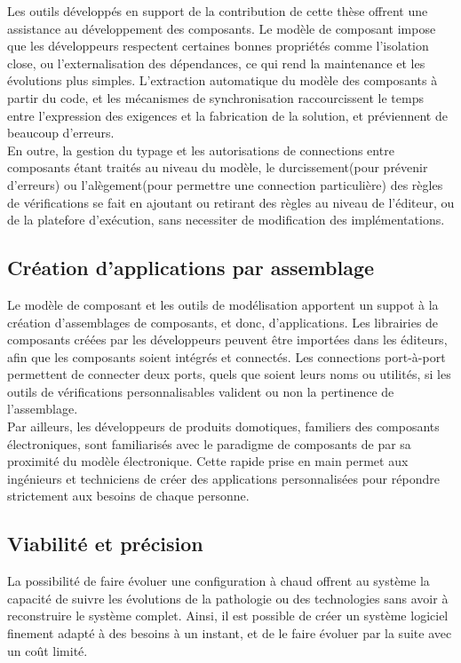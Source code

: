 Les outils développés en support de la contribution de cette thèse offrent une assistance au développement des composants. Le modèle de composant impose que les développeurs respectent certaines bonnes propriétés comme l'isolation close, ou l'externalisation des dépendances, ce qui rend la maintenance et les évolutions plus simples. L'extraction automatique du modèle des composants à partir du code, et les mécanismes de synchronisation raccourcissent le temps entre l'expression des exigences et la fabrication de la solution, et préviennent de beaucoup d'erreurs.\\
En outre, la gestion du typage et les autorisations de connections entre composants étant traités au niveau du modèle, le durcissement(pour prévenir d'erreurs) ou l'alègement(pour permettre une connection particulière) des règles de vérifications se fait en ajoutant ou retirant des règles au niveau de l'éditeur, ou de la platefore d'exécution, sans necessiter de modification des implémentations.	

\subsection{Création d'applications par assemblage}
Le modèle de composant et les outils de modélisation apportent un suppot à la création d'assemblages de composants, et donc, d'applications. Les librairies de composants créées par les développeurs peuvent être importées dans les éditeurs, afin que les composants soient intégrés et connectés. Les connections port-à-port permettent de connecter deux ports, quels que soient leurs noms ou utilités, si les outils de vérifications personnalisables valident ou non la pertinence de l'assemblage.\\
Par ailleurs, les développeurs de produits domotiques, familiers des composants électroniques, sont familiarisés avec le paradigme de composants de par sa proximité du modèle électronique. Cette rapide prise en main permet aux ingénieurs et techniciens de créer des applications personnalisées pour répondre strictement aux besoins de chaque personne.

\subsection{Viabilité et précision}
La possibilité de faire évoluer une configuration à chaud offrent au système la capacité de suivre les évolutions de la pathologie ou des technologies sans avoir à reconstruire le système complet. Ainsi, il est possible de créer un système logiciel finement adapté à des besoins à un instant, et de le faire évoluer par la suite avec un coût limité.

